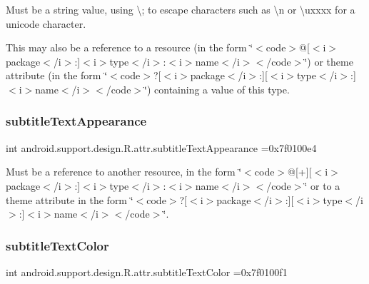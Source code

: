 Must be a string value, using \textquotesingle{}\textbackslash{};\textquotesingle{} to escape characters such as \textquotesingle{}\textbackslash{}n\textquotesingle{} or \textquotesingle{}\textbackslash{}uxxxx\textquotesingle{} for a unicode character. 

This may also be a reference to a resource (in the form \char`\"{}$<$code$>$@\mbox{[}$<$i$>$package$<$/i$>$\+:\mbox{]}$<$i$>$type$<$/i$>$\+:$<$i$>$name$<$/i$>$$<$/code$>$\char`\"{}) or theme attribute (in the form \char`\"{}$<$code$>$?\mbox{[}$<$i$>$package$<$/i$>$\+:\mbox{]}\mbox{[}$<$i$>$type$<$/i$>$\+:\mbox{]}$<$i$>$name$<$/i$>$$<$/code$>$\char`\"{}) containing a value of this type. \mbox{\label{classandroid_1_1support_1_1design_1_1R_1_1attr_a98ff73280c3e52b8adee36f97a9dd329}} 
\subsubsection{\texorpdfstring{subtitle\+Text\+Appearance}{subtitleTextAppearance}}
{\footnotesize\ttfamily int android.\+support.\+design.\+R.\+attr.\+subtitle\+Text\+Appearance =0x7f0100e4\hspace{0.3cm}{\ttfamily [static]}}

Must be a reference to another resource, in the form \char`\"{}$<$code$>$@\mbox{[}+\mbox{]}\mbox{[}$<$i$>$package$<$/i$>$\+:\mbox{]}$<$i$>$type$<$/i$>$\+:$<$i$>$name$<$/i$>$$<$/code$>$\char`\"{} or to a theme attribute in the form \char`\"{}$<$code$>$?\mbox{[}$<$i$>$package$<$/i$>$\+:\mbox{]}\mbox{[}$<$i$>$type$<$/i$>$\+:\mbox{]}$<$i$>$name$<$/i$>$$<$/code$>$\char`\"{}. \mbox{\label{classandroid_1_1support_1_1design_1_1R_1_1attr_acdc80a288896de3528fa898e7c23a687}} 
\subsubsection{\texorpdfstring{subtitle\+Text\+Color}{subtitleTextColor}}
{\footnotesize\ttfamily int android.\+support.\+design.\+R.\+attr.\+subtitle\+Text\+Color =0x7f0100f1\hspace{0.3cm}{\ttfamily [static]}}

